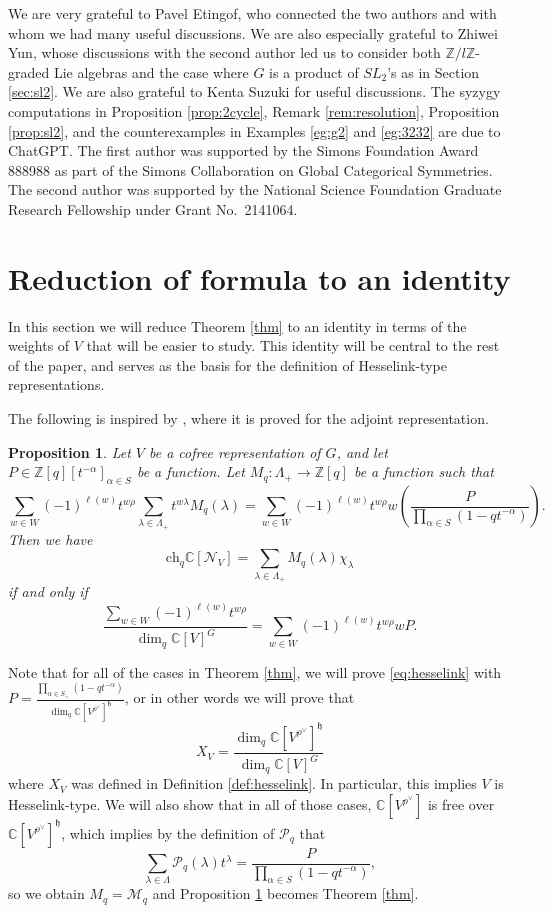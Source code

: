 \documentclass[12pt]{article}
\newcommand{\Z}{\mathbb{Z}}
\newcommand{\C}{\mathbb{C}}
\newtheorem{proposition}[theorem]{Proposition}
\theoremstyle{definition}
\theoremstyle{remark}
\renewcommand{\P}{\mathcal{P}}
\newcommand{\M}{\mathcal{M}}
\newcommand{\ch}{\mathrm{ch}}
\newcommand{\N}{\mathcal{N}}
\newcommand{\h}{\mathfrak{h}}
\begin{document}
We are very grateful to Pavel Etingof, who connected the two authors and with whom we had many useful discussions. We are also especially grateful to Zhiwei Yun, whose discussions with the second author led us to consider both $\Z/l\Z$-graded Lie algebras and the case where $G$ is a product of $SL_2$'s as in Section \ref{sec:sl2}. We are also grateful to Kenta Suzuki for useful discussions. The syzygy computations in Proposition \ref{prop:2cycle}, Remark \ref{rem:resolution}, Proposition \ref{prop:sl2}, and the counterexamples in Examples \ref{eg:g2} and \ref{eg:3232} are due to ChatGPT.
The first author was supported by the
Simons Foundation Award 888988 as part of the Simons Collaboration on Global Categorical
Symmetries. The second author was supported by the National Science Foundation Graduate Research Fellowship under Grant No.~2141064. 

\section{Reduction of formula to an identity}\label{sec:id}

In this section we will reduce Theorem \ref{thm} to an identity in terms of the weights of $V$ that will be easier to study. This identity will be central to the rest of the paper, and serves as the basis for the definition of Hesselink-type representations.

The following is inspired by \cite{hesselinkalg}, where it is proved for the adjoint representation.

\begin{proposition}\label{prop:hesselink}
    Let $V$ be a cofree representation of $G$, and let $P\in\Z[q][t^{-\alpha}]_{\alpha\in S}$ be a function. Let $M_q:\Lambda_+\to\Z[q]$ be a function such that
    \[\sum_{w\in W}(-1)^{\ell(w)}t^{w\rho}\sum_{\lambda\in\Lambda_+}t^{w\lambda}M_q(\lambda)=\sum_{w\in W}(-1)^{\ell(w)}t^{w\rho}w\left(\frac{P}{\prod_{\alpha\in S}(1-qt^{-\alpha})}\right).\]
    Then we have
    \[\ch_q\C[\N_V]=\sum_{\lambda\in\Lambda_+}M_q(\lambda)\chi_\lambda\]
    if and only if
    \begin{equation}
        \frac{\sum_{w\in W}(-1)^{\ell(w)}t^{w\rho}}{\dim_q\C[V]^G}=\sum_{w\in W}(-1)^{\ell(w)}t^{w\rho}wP.\label{eq:hesselink}
    \end{equation}
\end{proposition}

Note that for all of the cases in Theorem \ref{thm}, we will prove \eqref{eq:hesselink} with $P=\frac{\prod_{\alpha\in S_+}(1-qt^{-\alpha})}{\dim_q\C[V^{\rho^\vee}]^\h}$, or in other words we will prove that
\begin{equation}
    X_V=\frac{\dim_q\C[V^{\rho^\vee}]^{\h}}{\dim_q\C[V]^G}\label{eq:id}
\end{equation}
where $X_V$ was defined in Definition \ref{def:hesselink}. In particular, this implies $V$ is Hesselink-type. We will also show that in all of those cases, $\C[V^{\rho^\vee}]$ is free over $\C[V^{\rho^\vee}]^\h$, which implies by the definition of $\P_q$ that
\[\sum_{\lambda\in\Lambda}\P_q(\lambda)t^\lambda=\frac{P}{\prod_{\alpha\in S}(1-qt^{-\alpha})},\]
so we obtain $M_q=\M_q$ and Proposition \ref{prop:hesselink} becomes Theorem \ref{thm}. 
\end{document}

